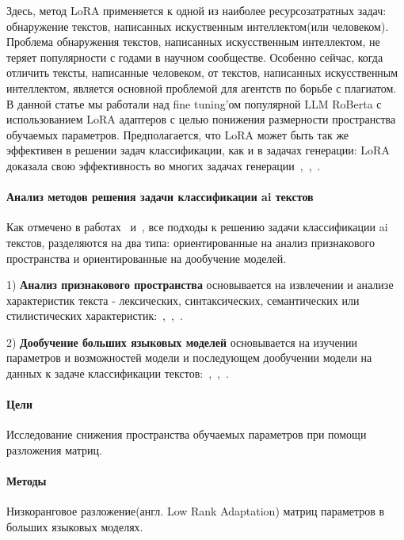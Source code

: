     Здесь, метод LoRA применяется к одной из наиболее ресурсозатратных задач: обнаружение текстов, написанных искуственным интеллектом(или человеком).
    Проблема обнаружения текстов, написанных искусственным интеллектом, не теряет популярности с годами в научном сообществе. Особенно сейчас, когда отличить тексты, написанные человеком, от текстов, написанных искусственным интеллектом, является основной проблемой для агентств по борьбе с плагиатом. В данной статье мы работали над fine tuning'ом популярной LLM RoBerta с использованием LoRA адаптеров с целью понижения размерности пространства обучаемых параметров. Предполагается, что LoRA может быть так же эффективен в решении задач классификации, как и в задачах генерации: LoRA доказала свою эффективность во многих задачах генерации~\cite{dettmers2024qlora},~\cite{hu2021lora},~\cite{dai2024instructblip}.

\paragraph{Анализ методов решения задачи классификации ai текстов}
Как отмечено в работах~\cite{he2023mgtbench} и~\cite{abdali2024decoding}, все подходы к решению задачи классификации ai текстов, разделяются на два типа: ориентированные на анализ признакового пространства и ориентированные на дообучение моделей. 

1) \textbf{Анализ признакового пространства} основывается на извлечении и анализе характеристик текста - лексических, синтаксических, семантических или стилистических характеристик:~\cite{liang2023gpt},~\cite{yu2023gpt},~\cite{yang2023dna}.


2) \textbf{Дообучение больших языковых моделей} основывается на изучении параметров и возможностей модели и последующем дообучении модели на данных к задаче классификации текстов:~\cite{wolf2019huggingface},~\cite{wolf2019huggingface},~\cite{qasim2022fine}.


\paragraph{Цели}
Исследование снижения пространства обучаемых параметров при помощи разложения матриц.

\paragraph{Методы}
Низкоранговое разложение(англ. Low Rank Adaptation) матриц параметров в больших языковых моделях.

